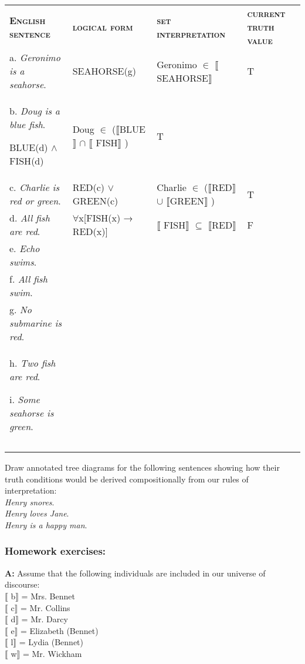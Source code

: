 \begin{tabularx}{\textwidth}{XXXX}
\lsptoprule

\bfseries\scshape English sentence & \bfseries\scshape logical form & \bfseries\scshape set interpretation & \textbf{\textsc{current truth value}}\\
a. \textit{Geronimo is a seahorse}. & SEAHORSE(g) & Geronimo ${\in}$ \textsc{$\llbracket$}SEAHORSE$\rrbracket$  & T\\
b. \textit{Doug is a blue fish}.

BLUE(d) $\wedge$ \textsc{FISH}(d) & Doug ${\in}$ (\textsc{$\llbracket$}BLUE$\rrbracket$  ${\cap}$ \textsc{$\llbracket$ FISH}$\rrbracket$ ) & T & \\
c. \textit{Charlie is red or green}. & RED(c) $\vee$ GREEN(c) & Charlie ${\in}$ (\textsc{$\llbracket$}RED$\rrbracket$  ${\cup}$ \textsc{$\llbracket$}GREEN$\rrbracket$ ) & T\\
d. \textit{All fish are red}. & ${\forall}$x[\textsc{FISH}(x) → RED(x)] & \textsc{$\llbracket$ FISH}$\rrbracket$  ${\subseteq}$ \textsc{$\llbracket$}RED$\rrbracket$  & F\\
e. \textit{Echo swims}. &  &  & \\
f. \textit{All fish swim}. &  &  & \\
g. \textit{No submarine is red}. &  &  & \\
h. \textit{Two fish are red}.

i. \textit{Some seahorse is green}. &  &  & \\
&  &  & \\
\lspbottomrule
\end{tabularx}

\ea%
    \label{ex:key:3}
    Draw annotated tree diagrams for the following sentences showing how their truth conditions would be derived compositionally from our rules of interpretation:\\
\ea \textit{Henry snores}.\\
\ex \textit{Henry loves Jane}.\\
\ex \textit{Henry is a happy man}.
                       \z
    \z

\subsubsection{Homework exercises:}\label{sec:}
\begin{stylepoints}
\textbf{A:} Assume that the following individuals are included in our universe of discourse:\\
{}$\llbracket$ b$\rrbracket$  = Mrs. Bennet\\
{}$\llbracket$ c$\rrbracket$  = Mr. Collins\\
{}$\llbracket$ d$\rrbracket$  = Mr. Darcy\\
{}$\llbracket$ e$\rrbracket$  = Elizabeth (Bennet)\\
{}$\llbracket$ l$\rrbracket$  = Lydia (Bennet)\\
{}$\llbracket$ w$\rrbracket$  = Mr. Wickham
\end{stylepoints}

